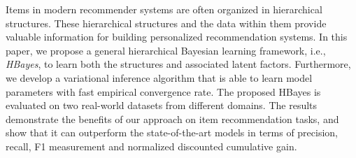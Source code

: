 Items in modern recommender systems are often organized in hierarchical structures. These hierarchical structures and the data within them provide valuable information for building personalized recommendation systems. In this paper, we propose a general hierarchical Bayesian learning framework, i.e., \emph{HBayes}, to learn both the structures and associated latent factors. Furthermore, we develop a variational inference algorithm that is able to learn model parameters with fast empirical convergence rate. The proposed HBayes is evaluated on two real-world datasets from different domains. The results demonstrate the benefits of our approach on  item recommendation tasks, and show that it can outperform the state-of-the-art models in terms of precision, recall, F1 measurement and normalized discounted cumulative gain.
